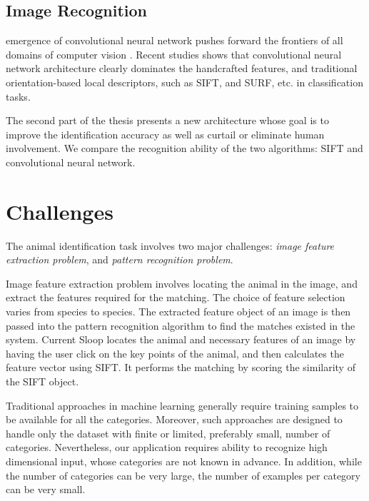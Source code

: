 \subsection{Image Recognition} %
emergence of convolutional neural network pushes forward the frontiers of all
domains of computer vision \cite{lecun95}. Recent studies shows that
convolutional neural network architecture clearly dominates the handcrafted
features, and traditional orientation-based local descriptors, such as
SIFT\cite{lowe04}, and SURF\cite{surf08}, etc. in classification
tasks\cite{fisher14,kriz12,prelu15,ILSVRC15}.

The second part of the thesis presents a new architecture whose goal is to
improve the identification accuracy as well as curtail or eliminate human
involvement. We compare the recognition ability of the two algorithms: SIFT and
convolutional neural network. 

\section{Challenges}

The animal identification task involves two major challenges: \emph{image
feature extraction problem}, and \emph{pattern recognition problem}. 

Image feature extraction problem involves locating the animal in the image, and
extract the features required for the matching. The choice of feature selection
varies from species to species. The extracted feature object of an image is then
passed into the pattern recognition algorithm to find the matches existed in the
system. Current Sloop locates the animal and necessary features of an image by
having the user click on the key points of the animal, and then calculates the
feature vector using SIFT. It performs the matching by scoring the similarity of
the SIFT object. 

Traditional approaches in machine learning generally require training samples to
be available for all the categories. Moreover, such approaches are designed to
handle only the dataset with finite or limited, preferably small, number of
categories. Nevertheless, our application requires ability to recognize high
dimensional input, whose categories are not known in advance. In addition, while
the number of categories can be very large, the number of examples per category
can be very small.

